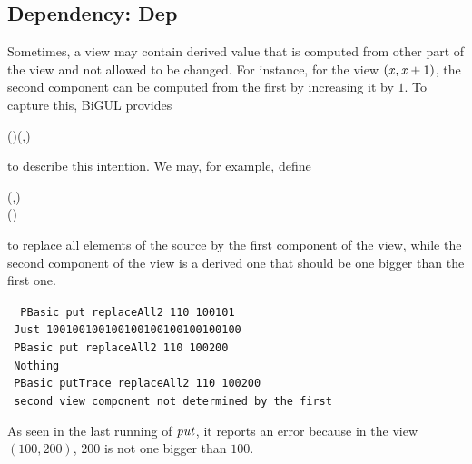 \subsection{Dependency: Dep}

Sometimes, a view may contain derived value that is computed from
other part of the view and not allowed
to be changed. For instance, for the view \ensuremath{(\Varid{x},\Varid{x}\mathbin{+}\mathrm{1})}, the second
component can be computed from the first by increasing it by \ensuremath{\mathrm{1}}.
To capture this, BiGUL provides
\begin{hscode}\SaveRestoreHook
{}%
%
%
\>[3]{}\mathbin{::}\;\Rightarrow (\to {})\to {}\;\;\to {}\;\;(,){}\<[E]%
\ColumnHook
\end{hscode}\resethooks
to describe this intention. We may, for example, define
\begin{hscode}\SaveRestoreHook
{}%
%
\>[B]{}\mathbin{::}\;(,){}\<[E]%
\\
\>[B]{}\mathrel{=}\;(\mathbin{+})\;\<[E]%
\ColumnHook
\end{hscode}\resethooks
to replace all elements of the source by the
first component of the view, while the second component
of the view is a derived one that should be one bigger than the first one.
\begin{tabbing}\tt
~PBasic~put~replaceAll2~110~100101\\
\tt ~Just~100100100100100100100100100100\\
\tt ~PBasic~put~replaceAll2~110~100200\\
\tt ~Nothing\\
\tt ~PBasic~putTrace~replaceAll2~110~100200\\
\tt ~second~view~component~not~determined~by~the~first
\end{tabbing}
As seen in the last running of \ensuremath{\Varid{put}}, it reports an error because in the view \ensuremath{(\mathrm{100},\mathrm{200})},
\ensuremath{\mathrm{200}} is not one bigger than \ensuremath{\mathrm{100}}.

